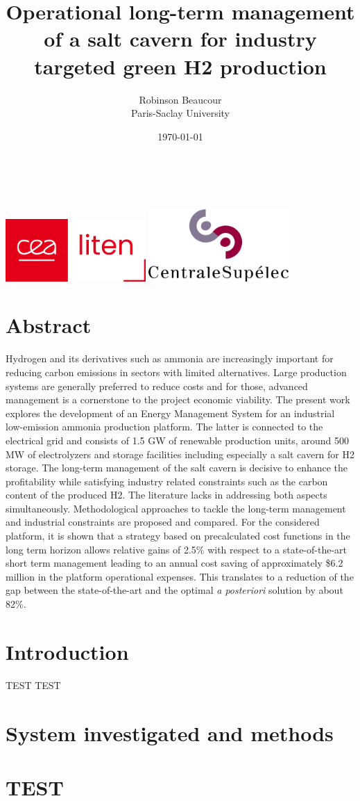 \documentclass{book}
\title{Operational long-term management of a salt cavern for industry targeted green H2 production}
\author{Robinson Beaucour\\Paris-Saclay University}
\date{\today}
\makeatletter
\renewcommand{\maketitle}{
    \begin{titlepage}
        \begin{center}
            \vspace*{\fill}
            {\LARGE \textbf{\@title}}
            \par\vspace{1.5cm}
            {\Large \@author} \\[1cm]
            {\large \@date} \\[1cm]
            \includegraphics[width=0.4\textwidth]{03_Images/LITEN.png}
            \hspace{0.05\textwidth}
            \includegraphics[width=0.4\textwidth]{03_Images/LogoCS.png}
            \vspace*{\fill}
        \end{center}
    \end{titlepage}
}
\makeatother
\begin{document}
\maketitle

\chapter*{Abstract}
\small
Hydrogen and its derivatives such as ammonia are increasingly important for reducing carbon emissions in sectors with limited alternatives. Large production systems are generally preferred to reduce costs and for those, advanced management is a cornerstone to the project economic viability.
The present work explores the development of an Energy Management System for an industrial low-emission ammonia production platform. The latter is connected to the electrical grid and consists of 1.5 GW of renewable production units, around 500 MW of electrolyzers and storage facilities including especially a salt cavern for H2 storage. The long-term management of the salt cavern is decisive to enhance the profitability while satisfying industry related constraints such as the carbon content of the produced H2. The literature lacks in addressing both aspects simultaneously. 
Methodological approaches to tackle the long-term management and industrial constraints are proposed and compared. For the considered platform, it is shown that a strategy based on precalculated cost functions in the long term horizon allows relative gains of 2.5\% with respect to a state-of-the-art short term management leading to an annual cost saving of approximately \$6.2 million in the platform operational expenses. This translates to a reduction of the gap between the state-of-the-art and the optimal \textit{a posteriori} solution by about 82\%.



\clearpage
\chapter{Introduction}
\label{Intro}

TEST TEST




\chapter{System investigated and methods}


\clearpage
\appendix
\chapter{TEST}






\end{document}
